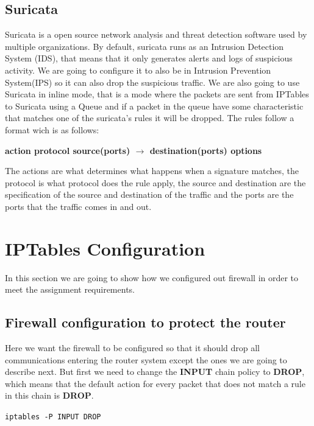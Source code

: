 \documentclass{article}
\begin{document}
\subsection{Suricata}
\label{subsec:suricata}
\quad Suricata is a open source network analysis and threat detection software used by multiple organizations. By default, suricata runs as an Intrusion Detection System (IDS), that means that it only generates alerts and logs of suspicious activity. We are going to configure it to also be in Intrusion Prevention System(IPS) so it can also drop the suspicious traffic. We are also going to use Suricata in inline mode, that is a mode where the packets are sent from IPTables to Suricata using a Queue and if a packet in the queue have some characteristic that matches one of the suricata's rules it will be dropped. The rules follow a format wich is as follows:\par
\begin{center}
\textbf{action protocol source(ports) $\rightarrow$ destination(ports) options}
\end{center} \par
The actions are what determines what happens when a signature matches, the protocol is what protocol does the rule apply, the source and destination are the specification of the source and destination of the traffic and the ports are the ports that the traffic comes in and out.
    


\section{IPTables Configuration}
\quad In this section we are going to show how we configured out firewall in order to meet the assignment requirements.

\subsection{Firewall configuration to protect the router}
\quad Here we want the firewall to be configured so that it should drop all communications entering the router system except the ones we are going to describe next. But first we need to change the \textbf{INPUT} chain policy to \textbf{DROP}, which means that the default action for every packet that does not match a rule in this chain is \textbf{DROP}. \par
\texttt{iptables -P INPUT DROP}
\end{document}
